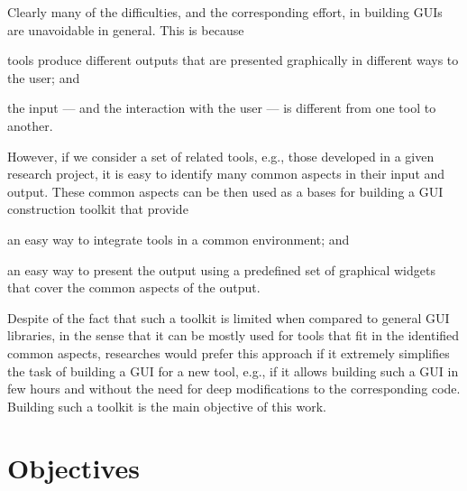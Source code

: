Clearly many of the difficulties, and the corresponding effort, in
building GUIs are unavoidable in general.  This is because
%
\begin{inparaenum}
%
\item tools produce different outputs that are presented graphically
  in different ways to the user; and
%
\item the input --- and the interaction with the user --- is different
  from one tool to another.
%
\end{inparaenum}
%
However, if we consider a set of related tools, e.g., those developed
in a given research project, it is easy to identify many common
aspects in their input and output. These common aspects can be then
used as a bases for building a GUI construction toolkit that provide
%
\begin{inparaenum}
%
\item an easy way to integrate tools in a common environment; and 
%
\item an easy way to present the output using a predefined set of
  graphical widgets that cover the common aspects of the output.
%
\end{inparaenum}
%
Despite of the fact that such a toolkit is limited when compared to
general GUI libraries, in the sense that it can be mostly used for
tools that fit in the identified common aspects, researches would
prefer this approach if it extremely simplifies the task of building a
GUI for a new tool, e.g., if it allows building such a GUI in few
hours and without the need for deep modifications to the corresponding
code.
%
Building such a toolkit is the main objective of this work.

\section{Objectives}
\label{sec:intro:objectives}

